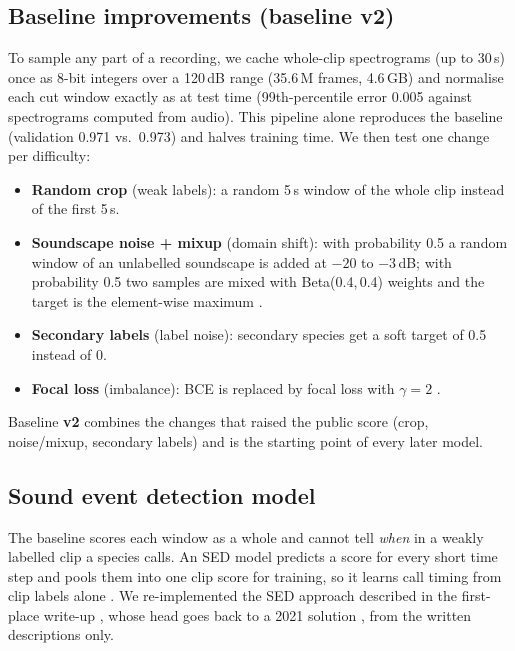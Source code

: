 \documentclass[letterpaper]{article} %
\begin{document}
\subsection{Baseline improvements (baseline v2)}
To sample any part of a recording, we cache whole-clip spectrograms (up to 30\,s) once as 8-bit integers over a 120\,dB range (35.6\,M frames, 4.6\,GB) and normalise each cut window exactly as at test time (99th-percentile error 0.005 against spectrograms computed from audio). This pipeline alone reproduces the baseline (validation 0.971 vs.\ 0.973) and halves training time. We then test one change per difficulty:
\begin{itemize}
\item \textbf{Random crop} (weak labels): a random 5\,s window of the whole clip instead of the first 5\,s.
\item \textbf{Soundscape noise + mixup} (domain shift): with probability 0.5 a random window of an unlabelled soundscape is added at $-20$ to $-3$\,dB; with probability 0.5 two samples are mixed with Beta(0.4,\,0.4) weights and the target is the element-wise maximum \citep{zhang2018mixup}.
\item \textbf{Secondary labels} (label noise): secondary species get a soft target of 0.5 instead of 0.
\item \textbf{Focal loss} (imbalance): BCE is replaced by focal loss with $\gamma=2$ \citep{lin2017focal}.
\end{itemize}
Baseline \textbf{v2} combines the changes that raised the public score (crop, noise/mixup, secondary labels) and is the starting point of every later model.

\subsection{Sound event detection model}
The baseline scores each window as a whole and cannot tell \emph{when} in a weakly labelled clip a species calls. An SED model predicts a score for every short time step and pools them into one clip score for training, so it learns call timing from clip labels alone \citep{mesaros2021sound,kong2020panns}. We re-implemented the SED approach described in the first-place write-up \citep{babych2025first}, whose head goes back to a 2021 solution \citep{tattaka2021fourth}, from the written descriptions only.
\end{document}
